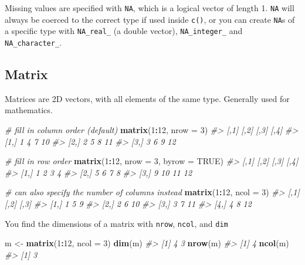 \documentclass[]{book}
\newenvironment{Shaded}{\begin{snugshade}}{\end{snugshade}}
\newcommand{\KeywordTok}[1]{\textcolor[rgb]{0.13,0.29,0.53}{\textbf{#1}}}
\newcommand{\DataTypeTok}[1]{\textcolor[rgb]{0.13,0.29,0.53}{#1}}
\newcommand{\DecValTok}[1]{\textcolor[rgb]{0.00,0.00,0.81}{#1}}
\newcommand{\StringTok}[1]{\textcolor[rgb]{0.31,0.60,0.02}{#1}}
\newcommand{\CommentTok}[1]{\textcolor[rgb]{0.56,0.35,0.01}{\textit{#1}}}
\newcommand{\OtherTok}[1]{\textcolor[rgb]{0.56,0.35,0.01}{#1}}
\newcommand{\OperatorTok}[1]{\textcolor[rgb]{0.81,0.36,0.00}{\textbf{#1}}}
\newcommand{\NormalTok}[1]{#1}
\begin{document}
Missing values are specified with \texttt{NA}, which is a logical vector
of length 1. \texttt{NA} will always be coerced to the correct type if
used inside \texttt{c()}, or you can create \texttt{NA}s of a specific
type with \texttt{NA\_real\_} (a double vector), \texttt{NA\_integer\_}
and \texttt{NA\_character\_}.

\subsection{Matrix}\label{matrix}

Matrices are 2D vectors, with all elements of the same type. Generally
used for mathematics.

\begin{Shaded}
\begin{Highlighting}[]
\CommentTok{# fill in column order (default)}
\KeywordTok{matrix}\NormalTok{(}\DecValTok{1}\OperatorTok{:}\DecValTok{12}\NormalTok{, }\DataTypeTok{nrow =} \DecValTok{3}\NormalTok{)}
\CommentTok{#>      [,1] [,2] [,3] [,4]}
\CommentTok{#> [1,]    1    4    7   10}
\CommentTok{#> [2,]    2    5    8   11}
\CommentTok{#> [3,]    3    6    9   12}

\CommentTok{# fill in row order}
\KeywordTok{matrix}\NormalTok{(}\DecValTok{1}\OperatorTok{:}\DecValTok{12}\NormalTok{, }\DataTypeTok{nrow =} \DecValTok{3}\NormalTok{, }\DataTypeTok{byrow =} \OtherTok{TRUE}\NormalTok{)}
\CommentTok{#>      [,1] [,2] [,3] [,4]}
\CommentTok{#> [1,]    1    2    3    4}
\CommentTok{#> [2,]    5    6    7    8}
\CommentTok{#> [3,]    9   10   11   12}

\CommentTok{# can also specify the number of columns instead}
\KeywordTok{matrix}\NormalTok{(}\DecValTok{1}\OperatorTok{:}\DecValTok{12}\NormalTok{, }\DataTypeTok{ncol =} \DecValTok{3}\NormalTok{)}
\CommentTok{#>      [,1] [,2] [,3]}
\CommentTok{#> [1,]    1    5    9}
\CommentTok{#> [2,]    2    6   10}
\CommentTok{#> [3,]    3    7   11}
\CommentTok{#> [4,]    4    8   12}
\end{Highlighting}
\end{Shaded}

You find the dimensions of a matrix with \texttt{nrow}, \texttt{ncol},
and \texttt{dim}

\begin{Shaded}
\begin{Highlighting}[]
\NormalTok{m <-}\StringTok{ }\KeywordTok{matrix}\NormalTok{(}\DecValTok{1}\OperatorTok{:}\DecValTok{12}\NormalTok{, }\DataTypeTok{ncol =} \DecValTok{3}\NormalTok{)}
\KeywordTok{dim}\NormalTok{(m)}
\CommentTok{#> [1] 4 3}
\KeywordTok{nrow}\NormalTok{(m)}
\CommentTok{#> [1] 4}
\KeywordTok{ncol}\NormalTok{(m)}
\CommentTok{#> [1] 3}
\end{Highlighting}
\end{Shaded}
\end{document}
